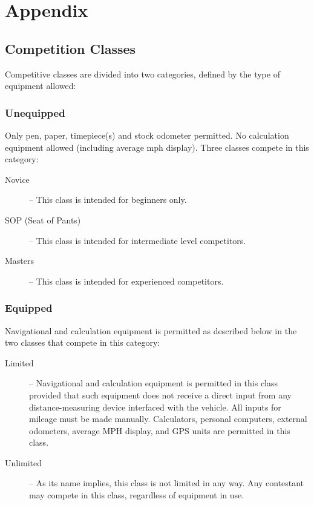 \section{Appendix}

\subsection{Competition Classes}
Competitive classes are divided into two categories, defined by the type of equipment allowed:

\subsubsection{Unequipped}
Only pen, paper, timepiece(s) and stock odometer permitted.  No calculation equipment allowed (including average mph display).  Three classes compete in this category:

\begin{description}

\item[Novice] -- This class is intended for beginners only.

\item[SOP (Seat of Pants)] -- This class is intended for intermediate level competitors.

\item[Masters] -- This class is intended for experienced competitors.

\end{description}

\subsubsection{Equipped}
Navigational and calculation equipment is permitted as described below in the two classes that compete in this category:

\begin{description}

\item[Limited] -- Navigational and calculation equipment is permitted in this class provided that such equipment does not receive a direct input from any distance-measuring device interfaced with the vehicle.  All inputs for mileage must be made manually.  Calculators, personal computers, external odometers, average MPH display, and GPS units are permitted in this class.

\item[Unlimited] -- As its name implies, this class is not limited in any way.  Any contestant may compete in this class, regardless of equipment in use.

\end{description}

